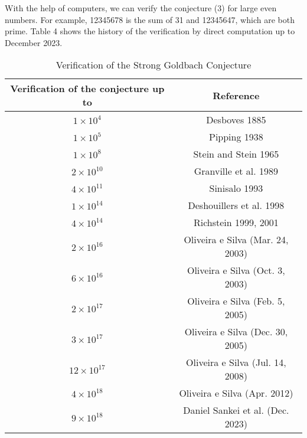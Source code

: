 \documentclass{article}
\begin{document}
With the help of computers, we can verify the conjecture (3) for large even numbers. For example, 12345678 is the sum of 31 and 12345647, which are both prime. Table 4 shows the history of the verification by direct computation up to December 2023.\vskip10mm
\begin{table}[h]
\centering
\begin{tabular}{|c|c|}
\hline
\textbf{Verification of the conjecture up to} & \textbf{Reference} \\ \hline
$1 \times 10^4$ & Desboves 1885 \\ \hline
$1 \times 10^5$ & Pipping 1938 \\ \hline
$1 \times 10^8$ & Stein and Stein 1965 \\ \hline
$2 \times 10^{10}$ & Granville et al. 1989 \\ \hline
$4 \times 10^{11}$ & Sinisalo 1993 \\ \hline
$1 \times 10^{14}$ & Deshouillers et al. 1998 \\ \hline
$4 \times 10^{14}$ & Richstein 1999, 2001 \\ \hline
$2 \times 10^{16}$ & Oliveira e Silva (Mar. 24, 2003) \\ \hline
$6 \times 10^{16}$ & Oliveira e Silva (Oct. 3, 2003) \\ \hline
$2 \times 10^{17}$ & Oliveira e Silva (Feb. 5, 2005) \\ \hline
$3 \times 10^{17}$ & Oliveira e Silva (Dec. 30, 2005) \\ \hline
$12 \times 10^{17}$ & Oliveira e Silva (Jul. 14, 2008) \\ \hline
$4 \times 10^{18}$ & Oliveira e Silva (Apr. 2012) \\ \hline
$9 \times 10^{18}$ & Daniel Sankei et al. (Dec. 2023) \\ \hline
\end{tabular}
\caption{Verification of the Strong Goldbach Conjecture \cite{num}}
\end{table}
\end{document}
